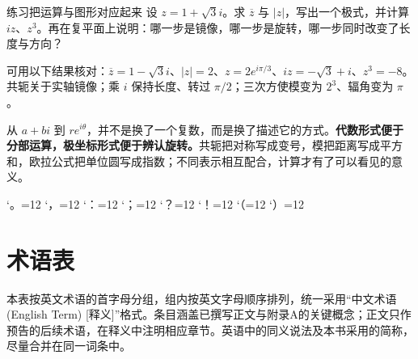 \documentclass[a4paper,12pt,twoside,openany,fontset=none]{ctexbook}
\newenvironment{exercise}[1][]{\begin{exBox}{练习}{#1}}{\end{exBox}}
\numberwithin{equation}{chapter}
\begin{document}
\begin{exercise}[把运算与图形对应起来]
设 $z=1+\sqrt3i$。求 $\overline z$ 与 $|z|$，写出一个极式，并计算 $iz$、$z^3$。再在复平面上说明：哪一步是镜像，哪一步是旋转，哪一步同时改变了长度与方向？
\end{exercise}

可用以下结果核对：$\overline z=1-\sqrt3i$、$|z|=2$、$z=2e^{i\pi/3}$、$iz=-\sqrt3+i$、$z^3=-8$。共轭关于实轴镜像；乘 $i$ 保持长度、转过 $\pi/2$；三次方使模变为 $2^3$、辐角变为 $\pi$。

从 $a+bi$ 到 $re^{i\theta}$，并不是换了一个复数，而是换了描述它的方式。\textbf{代数形式便于分部运算，极坐标形式便于辨认旋转。}共轭把对称写成变号，模把距离写成平方和，欧拉公式把单位圆写成指数；不同表示相互配合，计算才有了可以看见的意义。

\par\clearpage
\endgroup

\backmatter
\begingroup
\catcode`。=12 \catcode`，=12 \catcode`：=12 \catcode`；=12
\catcode`？=12 \catcode`！=12 \catcode`（=12 \catcode`）=12
\chapter*{术语表}
\linespread{1}\fontsize{11pt}{17pt}\selectfont
\setlength{\parindent}{0pt}\setlength{\parskip}{0pt}
本表按英文术语的首字母分组，组内按英文字母顺序排列，统一采用“中文术语 (English Term) [释义]”格式。条目涵盖已撰写正文与附录A的关键概念；正文只作预告的后续术语，在释义中注明相应章节。英语中的同义说法及本书采用的简称，尽量合并在同一词条中。\par\medskip
\PrintLectureGlossary
\par\clearpage
\endgroup
\end{document}
